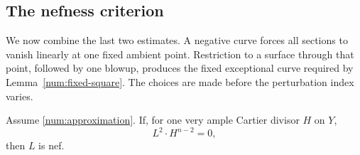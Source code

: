 \subsection{The nefness criterion}

We now combine the last two estimates. A negative curve forces all
sections to vanish linearly at one fixed ambient point. Restriction to
a surface through that point, followed by one blowup, produces the fixed
exceptional curve required by Lemma~\ref{num:fixed-square}. The choices
are made before the perturbation index varies.

\begin{proposition}
\label{num:nef}
Assume \eqref{num:approximation}.  If, for one very ample Cartier
divisor \(H\) on \(Y\),
\begin{equation}\label{num:zero-square}
L^2\cdot H^{n-2}=0,
\end{equation}
then \(L\) is nef.
\end{proposition}

